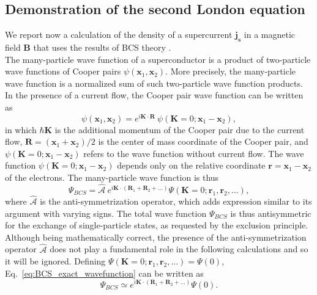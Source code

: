 \documentclass[../main/main.tex]{subfiles}
\begin{document}
\subsection{Demonstration of the second London equation}
We report now a calculation of the density of a supercurrent $\boldsymbol{j_s}$ in a magnetic field $\boldsymbol{B}$ that uses the results of BCS theory \cite{ibach2009solid}.\\
The many-particle wave function of a superconductor is a product of two-particle wave functions of Cooper pairs $\psi(\boldsymbol{x}_1,\boldsymbol{x}_2)$. More precisely, the many-particle wave function is a normalized sum of such two-particle wave function products. In the presence of a current flow, the Cooper pair wave function can be written as
\begin{equation} \label{eq:CP_wavefunc_supercurrentK}
    \psi(\boldsymbol{x}_1,\boldsymbol{x}_2) = e^{i \boldsymbol{K} \cdot \boldsymbol{R}}\ \psi(\boldsymbol{K}=0;\boldsymbol{x}_1-\boldsymbol{x}_2),
\end{equation}
in which $\hbar \boldsymbol{K}$ is the additional momentum of the Cooper pair due to the current flow, $\boldsymbol{R}=(\boldsymbol{x}_1+\boldsymbol{x}_2)/2$ is the center of mass coordinate of the Cooper pair, and $\psi(\boldsymbol{K}=0;\boldsymbol{x}_1-\boldsymbol{x}_2)$ refers to the wave function without current flow. The wave function $\psi(\boldsymbol{K}=0;\boldsymbol{x}_1-\boldsymbol{x}_2)$ depends only on the relative coordinate $\boldsymbol{r}=\boldsymbol{x}_1-\boldsymbol{x}_2$ of the electrons. The many-particle wave function is thus
\begin{equation} \label{eq:BCS_exact_wavefunction}
   \Psi_{BCS} = \hat{\mathcal{A}}\ e^{i \boldsymbol{K} \cdot (\boldsymbol{R}_1 + \boldsymbol{R}_2 + \dots)} \Psi(\boldsymbol{K}=0; \boldsymbol{r}_1, \boldsymbol{r}_2,\dots),
\end{equation}
where $\hat{\mathcal{A}}$ is the anti-symmetrization operator, which adds expression similar to its argument with varying signs. The total wave function $\Psi_{BCS}$ is thus antisymmetric for the exchange of single-particle states, as requested by the exclusion principle. Although being mathematically correct, the presence of the anti-symmetrization operator $\hat{\mathcal{A}}$ does not play a fundamental role in the following calculations and so it will be ignored. Defining $\Psi(\boldsymbol{K}=0; \boldsymbol{r}_1, \boldsymbol{r}_2,\dots) = \Psi(0)$, Eq.~\eqref{eq:BCS_exact_wavefunction} can be written as
\begin{equation} \label{eq:BCS_approx_wavefunction}
    \Psi_{BCS} \simeq e^{i \boldsymbol{K} \cdot (\boldsymbol{R}_1 + \boldsymbol{R}_2 + \dots)} \Psi(0).
\end{equation}
\end{document}
